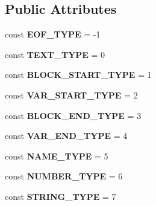 \subsection*{Public Attributes}
\begin{DoxyCompactItemize}
\item 
const {\bfseries E\+O\+F\+\_\+\+T\+Y\+PE} = -\/1\hypertarget{classTwig__Token_a3e535d9846c8ba69482dafc111df1879}{}\label{classTwig__Token_a3e535d9846c8ba69482dafc111df1879}

\item 
const {\bfseries T\+E\+X\+T\+\_\+\+T\+Y\+PE} = 0\hypertarget{classTwig__Token_a90f68fa887e2591c9464fc576185fb58}{}\label{classTwig__Token_a90f68fa887e2591c9464fc576185fb58}

\item 
const {\bfseries B\+L\+O\+C\+K\+\_\+\+S\+T\+A\+R\+T\+\_\+\+T\+Y\+PE} = 1\hypertarget{classTwig__Token_aca16a66b0a0051ef04bdada6d759b680}{}\label{classTwig__Token_aca16a66b0a0051ef04bdada6d759b680}

\item 
const {\bfseries V\+A\+R\+\_\+\+S\+T\+A\+R\+T\+\_\+\+T\+Y\+PE} = 2\hypertarget{classTwig__Token_a3ebdb8c8bb5379b2a75ae5474b5a8c87}{}\label{classTwig__Token_a3ebdb8c8bb5379b2a75ae5474b5a8c87}

\item 
const {\bfseries B\+L\+O\+C\+K\+\_\+\+E\+N\+D\+\_\+\+T\+Y\+PE} = 3\hypertarget{classTwig__Token_a23870d080745e1c5b5ab450171849521}{}\label{classTwig__Token_a23870d080745e1c5b5ab450171849521}

\item 
const {\bfseries V\+A\+R\+\_\+\+E\+N\+D\+\_\+\+T\+Y\+PE} = 4\hypertarget{classTwig__Token_adc65c9e13326c2844e9dc2cca9ea8405}{}\label{classTwig__Token_adc65c9e13326c2844e9dc2cca9ea8405}

\item 
const {\bfseries N\+A\+M\+E\+\_\+\+T\+Y\+PE} = 5\hypertarget{classTwig__Token_ae0c8154d97d8870feacefcce50f5d100}{}\label{classTwig__Token_ae0c8154d97d8870feacefcce50f5d100}

\item 
const {\bfseries N\+U\+M\+B\+E\+R\+\_\+\+T\+Y\+PE} = 6\hypertarget{classTwig__Token_a95cd6bafddee4360a27da562b58ad921}{}\label{classTwig__Token_a95cd6bafddee4360a27da562b58ad921}

\item 
const {\bfseries S\+T\+R\+I\+N\+G\+\_\+\+T\+Y\+PE} = 7\hypertarget{classTwig__Token_ae3451b59e59db2a2e94ef195db980a21}{}\label{classTwig__Token_ae3451b59e59db2a2e94ef195db980a21}


\end{DoxyCompactItemize}
